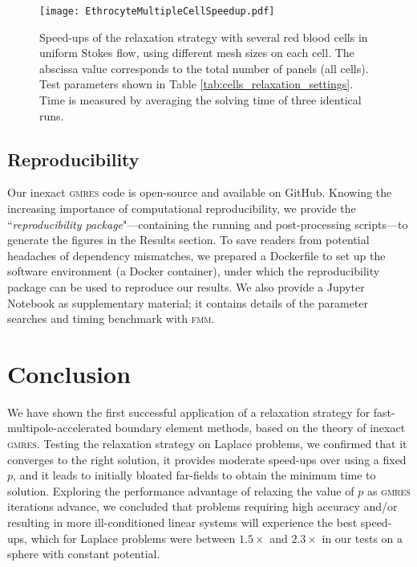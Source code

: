 \documentclass[smallcondensed,final]{svjour3}
\newcommand{\fmm}{\textsc{fmm}\xspace}
\newcommand{\gmres}{\textsc{gmres}\xspace}
\begin{document}
\begin{figure}[ht]
\begin{center}
	\texttt{[image: EthrocyteMultipleCellSpeedup.pdf]}
	\caption{Speed-ups of the relaxation strategy with several red blood cells in uniform Stokes flow, using different mesh sizes on each cell. The abscissa value corresponds to the total number of panels (all cells). Test parameters shown in Table \ref{tab:cells_relaxation_settings}. Time is measured by averaging the solving time of three identical runs.} 
	\label{fig:multiple_cell_speedup}
\end{center}
\end{figure}

\subsection{Reproducibility}

Our inexact \gmres code is open-source and available on GitHub. Knowing the increasing importance of computational reproducibility, we provide the ``\textit{reproducibility package}"---containing the running and post-processing scripts---to generate the figures in the Results section. To save readers from potential headaches of dependency mismatches, we prepared a Dockerfile to set up the software environment (a Docker container), under which the reproducibility package can be used to reproduce our results. We also provide a Jupyter Notebook as supplementary material; it contains details of the parameter searches and timing benchmark with \fmm.


\section{Conclusion} 

We have shown the first successful application of a relaxation strategy for fast-multipole-accelerated boundary element methods, based on the theory of inexact \gmres. Testing the relaxation strategy on Laplace problems, we confirmed that it converges to the right solution, it provides moderate speed-ups over using a fixed $p$, and it leads to initially bloated far-fields to obtain the minimum time to solution.
Exploring the performance advantage of relaxing the value of $p$ as \gmres iterations advance, we concluded that problems requiring high accuracy and/or resulting in more ill-conditioned linear systems will experience the best speed-ups, which for Laplace problems were between $1.5\times$ and $2.3\times$ in our tests on a sphere with constant potential.
\end{document}
